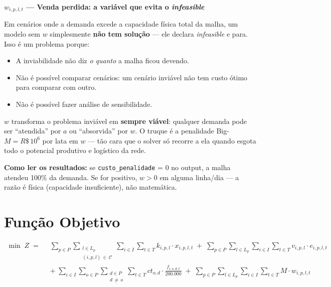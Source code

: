 \documentclass[12pt, a4paper]{article}
\begin{document}
\vspace{8pt}
\begin{mdframed}[style=destaque]
\textbf{\color{ballblue}$w_{i,p,l,t}$ --- Venda perdida: a vari\'{a}vel que evita o \textit{infeasible}}

\medskip
Em cen\'{a}rios onde a demanda excede a capacidade f\'{i}sica total da malha,
um modelo sem $w$ simplesmente \textbf{n\~{a}o tem solu\c{c}\~{a}o} --- ele declara
\textit{infeasible} e para. Isso \'{e} um problema porque:

\begin{itemize}[leftmargin=1.5em, itemsep=2pt]
  \item A inviabilidade n\~{a}o diz \textit{o quanto} a malha ficou devendo.
  \item N\~{a}o \'{e} poss\'{i}vel comparar cen\'{a}rios: um cen\'{a}rio invi\'{a}vel
        n\~{a}o tem custo \'{o}timo para comparar com outro.
  \item N\~{a}o \'{e} poss\'{i}vel fazer an\'{a}lise de sensibilidade.
\end{itemize}

\medskip
$w$ transforma o problema invi\'{a}vel em \textbf{sempre vi\'{a}vel}: qualquer demanda
pode ser ``atendida'' por $a$ ou ``absorvida'' por $w$. O truque \'{e} a penalidade
Big-$M = R\$\,10^6$ por lata em $w$ --- t\~{a}o cara que o solver s\'{o} recorre a
ela quando esgota todo o potencial produtivo e log\'{i}stico da rede.

\medskip
\textbf{Como ler os resultados:} se \texttt{custo\_penalidade} = 0 no output,
a malha atendeu 100\% da demanda. Se for positivo, $w > 0$ em alguma linha/dia
--- a raz\~{a}o \'{e} f\'{i}sica (capacidade insuficiente), n\~{a}o matem\'{a}tica.
\end{mdframed}

\section{Fun\c{c}\~{a}o Objetivo}

\[
  \begin{aligned}
    \min \; Z \;=\;\;
    & \sum_{p \in P}\sum_{\substack{l \in L_p \\ (i,p,l)\,\in\,\mathcal{C}}}\sum_{i \in I}\sum_{t \in T}
        k_{i,p,l} \cdot x_{i,p,l,t}
      \;+\;
      \sum_{p \in P}\sum_{l \in L_p}\sum_{i \in I}\sum_{t \in T}
        v_{i,p,l} \cdot e_{i,p,l,t} \\[10pt]
    & +\;
      \sum_{i \in I}\sum_{o \in P}\sum_{\substack{d \in P \\ d \,\neq\, o}}\sum_{t \in T}
        ct_{o,d} \cdot \frac{f_{i,o,d,t}}{200{.}000}
      \;+\;
      \sum_{p \in P}\sum_{l \in L_p}\sum_{i \in I}\sum_{t \in T}
        M \cdot w_{i,p,l,t}
  \end{aligned}
\]
\end{document}

